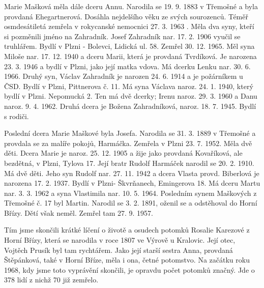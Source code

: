 \documentclass[../dejiny-rodu-prusiku.tex]{subfiles}
\begin{document}
Marie Mašková měla dále dceru Annu. Narodila se 19. 9. 1883 v Třemošné a byla provdaná Ehegartnerová. Dosáhla nejdelšího věku ze svých sourozenců. Téměř osmdesáti­letá zemřela v rokycanské nemocnici 27. 3. 1963 . Měla dva syny, kteří si pozměnili jméno na Zahradník. Josef Zahradník nar. 17. 2. 1906 vyučil se truhlářem. Bydlí v Plzni - Bolevci, Lidická ul. 58. Zemřel 30. 12. 1965. Měl syna Miloše nar. 17. 12. 1940 a dceru Marii, která je provdaná Tvrdíková. Je narozena 23. 3. 1946 a bydlí v Plzni, jako její matka vdova. Má dcerku Lenku nar. 30. 6. 1966. Druhý syn, Václav Zahradník je narozen 24. 6. 1914 a je požárníkem u ČSD. Bydlí v Plzni, Pittnerova č. 11. Má syna Václava naroz. 24. 1. 1940, který bydlí v Plzni. Nepomucká 2. Ten má dvě dcerky; Irenu naroz. 29. 3. 1960 a Danu naroz. 9. 4. 1962. Druhá dcera je Božena Zahradníková, naroz. 18. 7. 1945. Bydlí s rodiči.

Poslední dcera Marie Maškové byla Josefa. Narodila se 31. 3. 1889 v Třemošné a provdala se za malíře pokojů, Harmáčka. Zemřela v Plzni 23. 7. 1952. Měla dvě děti. Dcera Marie je naroz. 25. 12. 1905 a žije jako provdaná Kovaříková, ale bezdětná, v Plzni, Tylova 17. Její bratr Rudolf Harmáček narodil se 20. 2. 1910. Má dvě dě­ti. Jeho syn Rudolf nar. 27. 11. 1942 a dcera Vlasta provd. Biberlová je narozena 17. 2. 1937. Bydlí v Plzni- Škvrňanech, Emingerova 18. Má dceru Martu nar. 3. 3. 1962 a syna Vlastimila nar. 10. 5. 1964.
Posledním synem Maškových z Třemošné č. 17 byl Martin. Narodil se 3. 2. 1891, oženil se a odstěhoval do Horní Břízy. Dětí však neměl. Zemřel tam 27. 9. 1957.

Tím jsme skončili krátké líčení o životě a osudech potomků Rosalie Karezové z Horní Břízy,  která se narodila v roce 1807 ve Výrově u Kralovic. Její otec, Vojtěch Prusík byl tam rychtářem. Jako její starší sestra Anna, provdaná Štěpánková, také v Horní Bříze, měla i ona, četné potomstvo. Na začátku roku 1968, kdy jsme toto vyprávění skončili, je opravdu počet potomků značný. Jde o 378 lidí z nichž 70 již zemřelo.

\end{document}
